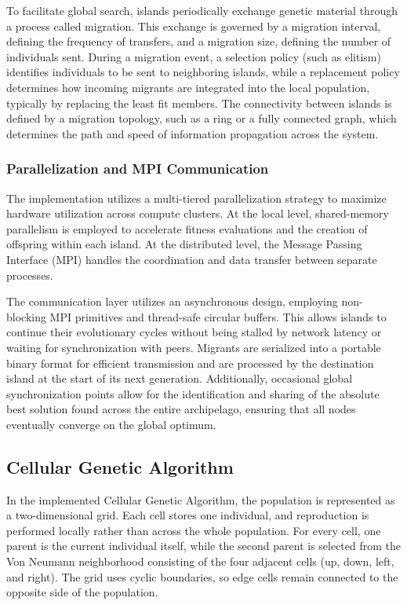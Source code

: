 \documentclass[conference]{IEEEtran}
\begin{document}
    To facilitate global search, islands periodically exchange genetic material through a process called migration. This exchange is governed by a migration interval, defining the frequency of transfers, and a migration size, defining the number of individuals sent. During a migration event, a selection policy (such as elitism) identifies individuals to be sent to neighboring islands, while a replacement policy determines how incoming migrants are integrated into the local population, typically by replacing the least fit members. The connectivity between islands is defined by a migration topology, such as a ring or a fully connected graph, which determines the path and speed of information propagation across the system.

    \subsubsection{Parallelization and MPI Communication}
    The implementation utilizes a multi-tiered parallelization strategy to maximize hardware utilization across compute clusters. At the local level, shared-memory parallelism is employed to accelerate fitness evaluations and the creation of offspring within each island. At the distributed level, the Message Passing Interface (MPI) handles the coordination and data transfer between separate processes. 

    The communication layer utilizes an asynchronous design, employing non-blocking MPI primitives and thread-safe circular buffers. This allows islands to continue their evolutionary cycles without being stalled by network latency or waiting for synchronization with peers. Migrants are serialized into a portable binary format for efficient transmission and are processed by the destination island at the start of its next generation. Additionally, occasional global synchronization points allow for the identification and sharing of the absolute best solution found across the entire archipelago, ensuring that all nodes eventually converge on the global optimum.

    \subsection{Cellular Genetic Algorithm}
    In the implemented Cellular Genetic Algorithm, the population is represented as a two-dimensional grid. Each cell stores one individual, and reproduction is performed locally rather than across the whole population. For every cell, one parent is the current individual itself, while the second parent is selected from the Von Neumann neighborhood consisting of the four adjacent cells (up, down, left, and right). The grid uses cyclic boundaries, so edge cells remain connected to the opposite side of the population.
\end{document}
